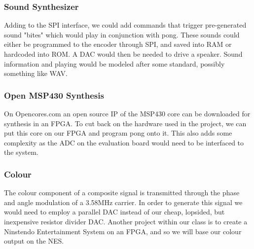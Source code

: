 \subsubsection*{Sound Synthesizer}

Adding to the SPI interface, we could add commands that trigger pre-generated
sound "bites" which would play in conjunction with pong. These sounds could
either be programmed to the encoder through SPI, and saved into RAM or hardcoded
into ROM. A DAC would then be needed to drive a speaker. Sound information and
playing would be modeled after some standard, possibly something like WAV.

\subsubsection*{Open MSP430 Synthesis}

On Opencores.com an open source IP of the MSP430 core can be downloaded for
synthesis in an FPGA. To cut back on the hardware used in the project, we can
put this core on our FPGA and program pong onto it. This also adds some
complexity as the ADC on the evaluation board would need to be interfaced to the
system.

\subsubsection*{Colour}

The colour component of a composite signal is transmitted through the phase and
angle modulation of a 3.58MHz carrier. In order to generate this signal we would
need to employ a parallel DAC instead of our cheap, lopsided, but inexpensive
resistor divider DAC. Another project within our class is to create a Ninstendo
Entertainment System on an FPGA, and so we will base our colour output on the
NES.

